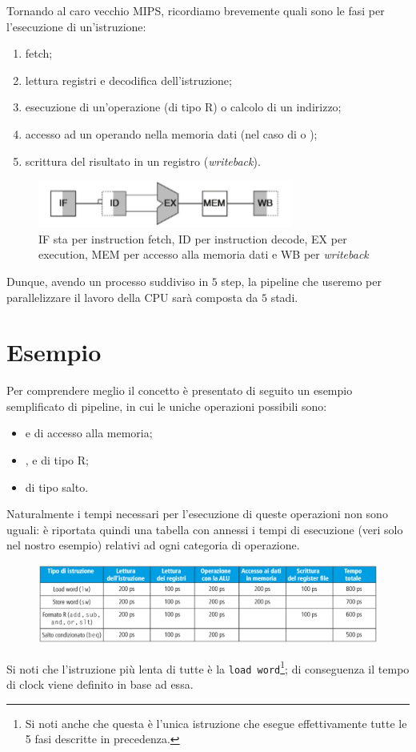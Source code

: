 \documentclass[class=book, crop=false, oneside]{standalone}
\begin{document}
Tornando al caro vecchio MIPS, ricordiamo brevemente quali sono le fasi per l'esecuzione di un'istruzione:
\begin{enumerate}[noitemsep]
	\item fetch;
	\item lettura registri e decodifica dell'istruzione;
	\item esecuzione di un'operazione (di tipo R) o calcolo di un indirizzo;
	\item accesso ad un operando nella memoria dati (nel caso di  o );
	\item scrittura del risultato in un registro (\emph{writeback}).
\end{enumerate}
\begin{figure}
	\centering
	\includegraphics[width=.5\textwidth,keepaspectratio]{istruzione.png}
	\caption{IF sta per instruction fetch, ID per instruction decode, EX per execution, MEM per accesso alla memoria dati e WB per \emph{writeback}}
\end{figure}
Dunque, avendo un processo suddiviso in \(5\) step, la pipeline che useremo per parallelizzare il lavoro della CPU sarà composta da \(5\) stadi.

\section{Esempio}
Per comprendere meglio il concetto è presentato di seguito un esempio semplificato di pipeline, in cui le uniche operazioni possibili sono:
\begin{itemize}
	\item {} e  di accesso alla memoria;
	\item {},  e  di tipo R;
	\item {} di tipo salto.
\end{itemize}
Naturalmente i tempi necessari per l'esecuzione di queste operazioni non sono uguali: è riportata quindi una tabella con annessi i tempi di esecuzione (veri solo nel nostro esempio) relativi ad ogni categoria di operazione.
\begin{figure}[H]
	\centering
	\includegraphics[width=\textwidth,keepaspectratio]{tabella-tempi-operazioni.png}
\end{figure}
Si noti che l'istruzione più lenta di tutte è la \texttt{load word}\footnote{Si noti anche che questa è l'unica istruzione che esegue effettivamente tutte le 5 fasi descritte in precedenza.}; di conseguenza il tempo di clock viene definito in base ad essa.
\end{document}
